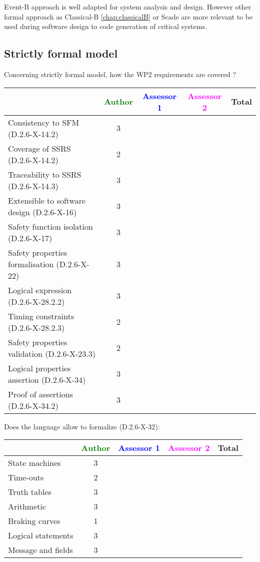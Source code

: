 \begin{author_comment}
Event-B  approach is well adapted for system analysis and design. However other formal approach as Classical-B \ref{chap:classicalB} or Scade are more relevant to be used during software design to code generation of critical systems.
\end{author_comment}

\subsection{Strictly formal model}

Concerning strictly formal model, how the WP2 requirements are covered ?

\begin{tabular}{|l | c | c | c | c|}
\hline
& \textcolor{green}{Author} & \textcolor{blue}{Assessor 1} & \textcolor{magenta}{Assessor 2} & Total \\
\hline 
Consistency to SFM (D.2.6-X-14.2) & 3 & & &  \\
\hline
Coverage of SSRS (D.2.6-X-14.2)  & 2 & & &  \\
\hline
Traceability to  SSRS (D.2.6-X-14.3)  & 3 & & &  \\
\hline
Extensible to software design (D.2.6-X-16)  & 3 & & &  \\
\hline
Safety function isolation (D.2.6-X-17)  & 3 & & &  \\
\hline 
Safety properties formalisation (D.2.6-X-22)  & 3 & & &  \\
\hline
Logical expression (D.2.6-X-28.2.2)  & 3 & & &  \\
\hline
Timing constraints (D.2.6-X-28.2.3)  & 2 & & &  \\
\hline
Safety properties validation (D.2.6-X-23.3)  & 2 & & &  \\
\hline
Logical properties assertion (D.2.6-X-34)  & 3 & & &  \\
\hline
Proof of assertions (D.2.6-X-34.2)  & 3 & & &  \\
\hline
\end{tabular}

Does the language allow to  formalize (D.2.6-X-32):

\begin{tabular}{|l | c | c | c | c|}
\hline
& \textcolor{green}{Author} & \textcolor{blue}{Assessor 1} & \textcolor{magenta}{Assessor 2} & Total \\
\hline 
State machines  & 3 & & &  \\
\hline
Time-outs  & 2 & & &  \\
\hline
Truth tables  & 3 & & &  \\
\hline
Arithmetic  & 3 & & &  \\
\hline
Braking curves  & 1 & & &  \\
\hline
Logical statements & 3 & & &  \\
\hline
Message and fields & 3 & & &  \\
\hline
\end{tabular}

